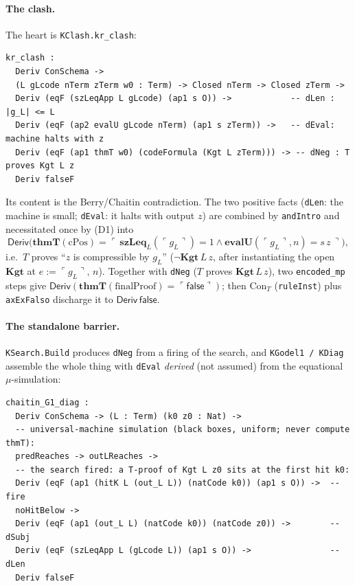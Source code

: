 \documentclass[11pt]{article}
\theoremstyle{plain}
\theoremstyle{definition}
\theoremstyle{remark}
\newcommand{\code}[1]{\ulcorner #1 \urcorner}
\newcommand{\thmT}{\mathbf{thmT}}
\newcommand{\evalU}{\mathbf{evalU}}
\newcommand{\Deriv}{\mathsf{Deriv}}
\newcommand{\Con}{\mathrm{Con}_T}
\newcommand{\Kgt}{\mathbf{Kgt}}
\newcommand{\false}{\mathsf{false}}
\newcommand{\sze}{\mathbf{szLeq}}
\begin{document}
\paragraph{The clash.} The heart is \texttt{KClash.kr\_clash}:

\begin{lstlisting}
kr_clash :
  Deriv ConSchema ->
  (L gLcode nTerm zTerm w0 : Term) -> Closed nTerm -> Closed zTerm ->
  Deriv (eqF (szLeqApp L gLcode) (ap1 s O)) ->            -- dLen : |g_L| <= L
  Deriv (eqF (ap2 evalU gLcode nTerm) (ap1 s zTerm)) ->   -- dEval: machine halts with z
  Deriv (eqF (ap1 thmT w0) (codeFormula (Kgt L zTerm))) -> -- dNeg : T proves Kgt L z
  Deriv falseF
\end{lstlisting}

\noindent Its content is the Berry/Chaitin contradiction. The two positive facts
(\texttt{dLen}: the machine is small; \texttt{dEval}: it halts with output $z$)
are combined by \texttt{andIntro} and necessitated once by (D1) into
\[
  \Deriv\big(\thmT(\text{cPos}) = \code{\,\sze_L(\code{g_L})=1 \wedge
  \evalU(\code{g_L},n)=s\,z\,}\big),
\]
i.e.\ $T$ proves ``$z$ is compressible by $g_L$''
($\neg\Kgt\,L\,z$, after instantiating the open $\Kgt$ at $e:=\code{g_L},\,n$).
Together with \texttt{dNeg} ($T$ proves $\Kgt\,L\,z$), two \texttt{encoded\_mp}
steps give $\Deriv(\thmT(\text{finalProof}) = \code{\false})$; then $\Con$
(\texttt{ruleInst}) plus \texttt{axExFalso} discharge it to $\Deriv\,\false$.

\paragraph{The standalone barrier.} \texttt{KSearch.Build} produces \texttt{dNeg}
from a firing of the search, and \texttt{KGodel1\,/\,KDiag} assemble the whole
thing with \texttt{dEval} \emph{derived} (not assumed) from the equational
$\mu$-simulation:

\begin{lstlisting}
chaitin_G1_diag :
  Deriv ConSchema -> (L : Term) (k0 z0 : Nat) ->
  -- universal-machine simulation (black boxes, uniform; never compute thmT):
  predReaches -> outLReaches ->
  -- the search fired: a T-proof of Kgt L z0 sits at the first hit k0:
  Deriv (eqF (ap1 (hitK L (out_L L)) (natCode k0)) (ap1 s O)) ->  -- fire
  noHitBelow ->
  Deriv (eqF (ap1 (out_L L) (natCode k0)) (natCode z0)) ->        -- dSubj
  Deriv (eqF (szLeqApp L (gLcode L)) (ap1 s O)) ->                -- dLen
  Deriv falseF
\end{lstlisting}
\end{document}
